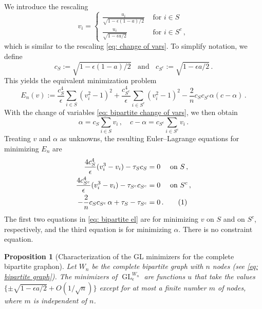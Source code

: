 \documentclass[11pt]{amsart}
\newtheorem{proposition}{Proposition}[section]
\def\ep{\epsilon}
\newcommand\numberthis{\addtocounter{equation}{1}\tag{\theequation}}
\def\GL{\operatorname{GL}}
\numberwithin{equation}{section}
\begin{document}
{We introduce the rescaling
\begin{equation}\label{eq: bipartite change of vars}
    v_i = \begin{cases}
        \frac{u_i}{\sqrt{1 - \ep(1 - a)/2}} &\text{ for } i\in S 
        \\
        \frac{u_i}{\sqrt{1 - \ep a/2}} &\text{ for } i\in S^c \,,
    \end{cases}
\end{equation}
which is similar to the rescaling \eqref{eq: change of vars}. To simplify notation, we define 
\begin{equation}  
    c_S := \sqrt{1 - \ep(1 - a)/2} \;\; \text{ and } \;\; c_{S^c} := \sqrt{1 - \ep a/2} \,.
\end{equation}
This yields the equivalent minimization problem 
\begin{equation}\label{eq: euivalent bipartite fnl}
    E_n(v) :=  \frac{c_S^4}{\ep} \sum_{i\in S} (v_i^2 - 1)^2 + \frac{c_{S^c}^4}{\ep} \sum_{i\in S^c} (v_i^2 - 1)^2 - \frac{2}{n} c_S c_{S^c}  \alpha(c - \alpha) \,.  
\end{equation}
With the change of variables \eqref{eq: bipartite change of vars}, we then obtain
\begin{equation}\label{eq: bipartite vol constraint}
    \alpha = c_S \sum_{i\in S} v_i \,, \quad  c - \alpha = c_{S^c} \sum_{i\in S^c} v_i \,.
\end{equation}
Treating $v$ and $\alpha$ as unknowns, the resulting {Euler--Lagrange} equations for minimizing $E_n$ are 
\begin{align*}
      \frac{4c_S^4}{\ep} (v_i^3 - v_i ) - \tau_{S}c_S  &= 0 \quad \text{ on } S \,,  \\
    \frac{4c_{S^c}^4}{\ep} (v_i^3 - v_i ) - \tau_{S^c}c_{S^c} &= 0 \quad \text{ on } S^c \,, \\
    -\frac{2}{n} c_S c_{S^c} \, \alpha + \tau_{S} - \tau_{S^c} &= 0 \,. \numberthis \label{eq: bipartite el}
\end{align*}
The first two equations in \eqref{eq: bipartite el} are for minimizing 
$v$ on $S$ and on $S^c$, respectively, and the third equation is for minimizing $\alpha$. There is no constraint equation.


\begin{proposition}[Characterization of the GL minimizers for the complete bipartite graphon]\label{seven-two}
    Let $W_n$ be the complete bipartite graph with $n$ nodes (see \eqref{eq: bipartite graph}). The minimizers of $\GL^{W_n}_\ep$ are functions $u$ that take the values $\{ \pm \sqrt{1 - \ep a/2} + O(1/\sqrt{n})\}$ except for at most a finite number {$m$} of nodes, where $m$ is independent of $n$. 
\end{proposition}


}
\end{document}
